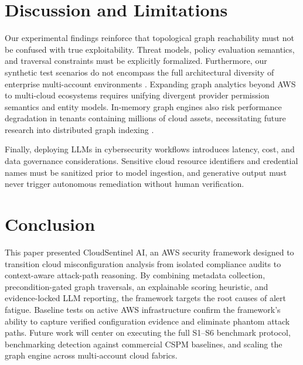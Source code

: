 \documentclass[conference]{IEEEtran}
\begin{document}
\section{Discussion and Limitations}
Our experimental findings reinforce that topological graph reachability must not be confused with true exploitability. Threat models, policy evaluation semantics, and traversal constraints must be explicitly formalized. Furthermore, our synthetic test scenarios do not encompass the full architectural diversity of enterprise multi-account environments \cite{liu2024misconfigurations,rahman2019icsesmells}. Expanding graph analytics beyond AWS to multi-cloud ecosystems \cite{torkura2021multicloud,saxena2021multicloud} requires unifying divergent provider permission semantics and entity models. In-memory graph engines also risk performance degradation in tenants containing millions of cloud assets, necessitating future research into distributed graph indexing \cite{sabur2022scalable}.

Finally, deploying LLMs in cybersecurity workflows introduces latency, cost, and data governance considerations. Sensitive cloud resource identifiers and credential names must be sanitized prior to model ingestion, and generative output must never trigger autonomous remediation without human verification.

\section{Conclusion}
This paper presented CloudSentinel AI, an AWS security framework designed to transition cloud misconfiguration analysis from isolated compliance audits to context-aware attack-path reasoning. By combining metadata collection, precondition-gated graph traversals, an explainable scoring heuristic, and evidence-locked LLM reporting, the framework targets the root causes of alert fatigue. Baseline tests on active AWS infrastructure confirm the framework's ability to capture verified configuration evidence and eliminate phantom attack paths. Future work will center on executing the full S1--S6 benchmark protocol, benchmarking detection against commercial CSPM baselines, and scaling the graph engine across multi-account cloud fabrics.



\end{document}
